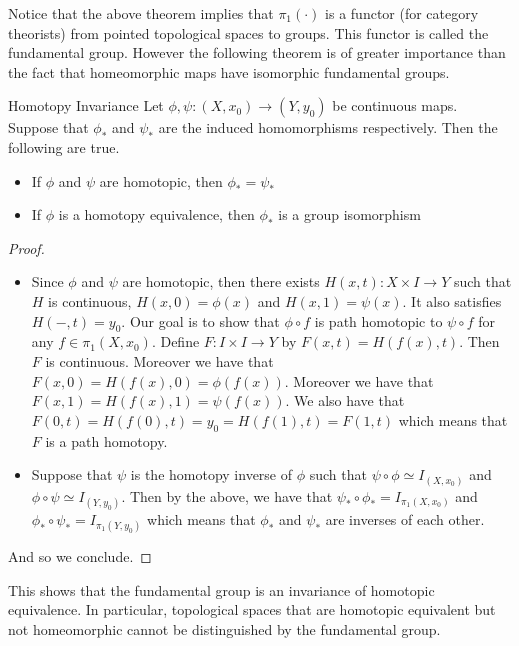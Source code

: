 \documentclass[a4paper]{article}
\begin{document}
Notice that the above theorem implies that $\pi_1(\cdot)$ is a functor (for category theorists) from pointed topological spaces to groups. This functor is called the fundamental group. However the following theorem is of greater importance than the fact that homeomorphic maps have isomorphic fundamental groups. 

\begin{thm}{Homotopy Invariance}{} Let $\phi,\psi:(X,x_0)\to(Y,y_0)$ be continuous maps. Suppose that $\phi_\ast$ and $\psi_\ast$ are the induced homomorphisms respectively. Then the following are true. 
\begin{itemize}
\item If $\phi$ and $\psi$ are homotopic, then $\phi_\ast=\psi_\ast$
\item If $\phi$ is a homotopy equivalence, then $\phi_\ast$ is a group isomorphism
\end{itemize} \tcbline
\begin{proof}~\\
\begin{itemize}
\item Since $\phi$ and $\psi$ are homotopic, then there exists $H(x,t):X\times I\to Y$ such that $H$ is continuous, $H(x,0)=\phi(x)$ and $H(x,1)=\psi(x)$. It also satisfies $H(-,t)=y_0$. Our goal is to show that $\phi\circ f$ is path homotopic to $\psi\circ f$ for any $f\in\pi_1(X,x_0)$. Define $F:I\times I\to Y$ by $F(x,t)=H(f(x),t)$. Then $F$ is continuous. Moreover we have that $F(x,0)=H(f(x),0)=\phi(f(x))$. Moreover we have that $F(x,1)=H(f(x),1)=\psi(f(x))$. We also have that $F(0,t)=H(f(0),t)=y_0=H(f(1),t)=F(1,t)$ which means that $F$ is a path homotopy. 
\item Suppose that $\psi$ is the homotopy inverse of $\phi$ such that $\psi\circ\phi\simeq I_{(X,x_0)}$ and $\phi\circ\psi\simeq I_{(Y,y_0)}$. Then by the above, we have that $\psi_\ast\circ\phi_\ast=I_{\pi_1(X,x_0)}$ and $\phi_\ast\circ\psi_\ast=I_{\pi_1(Y,y_0)}$ which means that $\phi_\ast$ and $\psi_\ast$ are inverses of each other. 
\end{itemize}
And so we conclude. 
\end{proof}
\end{thm}

This shows that the fundamental group is an invariance of homotopic equivalence. In particular, topological spaces that are homotopic equivalent but not homeomorphic cannot be distinguished by the fundamental group. \\~\\
\end{document}
